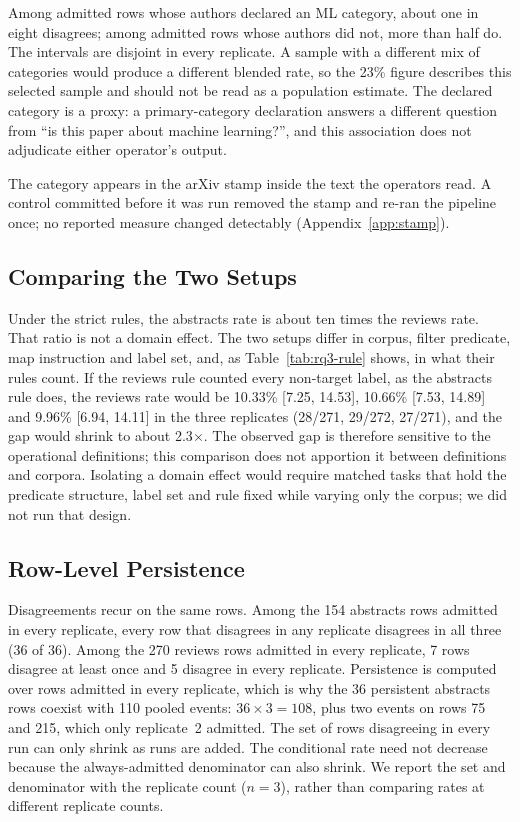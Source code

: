 \documentclass[11pt]{article}
\begin{document}
Among admitted rows whose authors declared an ML category, about one in eight
disagrees; among admitted rows whose authors did not, more than half do. The
intervals are disjoint in every replicate. A sample with a different mix of
categories would produce a different blended rate, so the 23\% figure
describes this selected sample and should not be read as a population
estimate. The declared category is a proxy: a primary-category declaration
answers a different question from ``is this paper about machine learning?'',
and this association does not adjudicate either operator's output.

The category appears in the arXiv stamp inside the text the operators read.
A control committed before it was run removed the stamp and re-ran the
pipeline once; no reported measure changed detectably (Appendix~\ref{app:stamp}).

\subsection{Comparing the Two Setups}

Under the strict rules, the abstracts rate is about ten times the reviews
rate. That ratio is not a domain effect. The two setups differ in corpus,
filter predicate, map instruction and label set, and, as
Table~\ref{tab:rq3-rule} shows, in what their rules count. If the reviews
rule counted every non-target label, as the abstracts rule does, the reviews
rate would be 10.33\% [7.25, 14.53], 10.66\% [7.53, 14.89] and 9.96\%
[6.94, 14.11] in the three replicates (28/271, 29/272, 27/271), and the gap
would shrink to about 2.3$\times$. The observed gap is therefore sensitive to the operational definitions;
this comparison does not apportion it between definitions and corpora. Isolating a domain effect
would require matched tasks that hold the predicate structure, label set and
rule fixed while varying only the corpus; we did not run that design.

\subsection{Row-Level Persistence}

Disagreements recur on the same rows. Among the 154 abstracts rows admitted
in every replicate, every row that disagrees in any replicate disagrees in
all three (36 of 36). Among the 270 reviews rows admitted in every replicate,
7 rows disagree at least once and 5 disagree in every replicate. Persistence
is computed over rows admitted in every replicate, which is why the 36
persistent abstracts rows coexist with 110 pooled events: $36 \times 3 = 108$,
plus two events on rows 75 and 215, which only replicate~2 admitted.
The set of rows disagreeing in every run can only shrink as runs are added.
The conditional rate need not decrease because the always-admitted denominator
can also shrink. We report the set and denominator with the replicate count
($n=3$), rather than comparing rates at different replicate counts.
\end{document}
